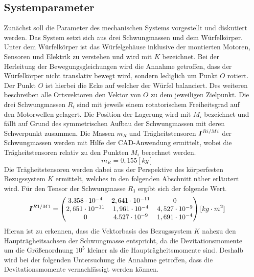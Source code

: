 \subsection{Systemparameter}
Zunächst soll die Parameter des mechanischen Systems vorgestellt und diskutiert werden. Das System setzt sich aus drei Schwungmassen und dem Würfelkörper. Unter dem Würfelkörper ist das Würfelgehäuse inklusive der montierten Motoren, Sensoren und Elektrik zu verstehen und wird mit $K$ bezeichnet. Bei der Herleitung der Bewegungsgleichungen wird die Annahme getroffen, dass der Würfelkörper nicht translativ bewegt wird, sondern lediglich um Punkt $O$ rotiert. Der Punkt $O$ ist hierbei die Ecke auf welcher der Würfel balanciert. Des weiteren beschreiben alle Ortsvektoren den Vektor von $O$ zu dem jeweiligen Zielpunkt. Die drei Schwungmassen $R_i$ sind mit jeweils einem rotatorischem Freiheitsgrad auf den Motorwellen gelagert. Die Position der Lagerung wird mit $M_i$ bezeichnet und fällt auf Grund des symmetrischen Aufbau der Schwungmassen mit deren Schwerpunkt zusammen.
Die Massen $m_R$ und Trägheitstensoren $\boldsymbol{I}^{Ri/Mi}$ der Schwungmassen werden mit Hilfe der CAD-Anwendung ermittelt, wobei die Trägheitstensoren relativ zu den Punkten $M_i$ berechnet werden.
\begin{equation}
m_R = 0,155 [kg]
\end{equation} 
Die Trägheitstensoren werden dabei aus der Perspektive des körperfesten Bezugssystem $K$ ermittelt, welches in den folgenden Abschnitt näher erläutert wird. Für den Tensor der Schwungmasse $R_1$ ergibt sich der folgende Wert.
\begin{equation}
 \boldsymbol{I}^{R1/M1} = \begin{pmatrix}
3.358\cdot 10^{-4} & 2,641\cdot 10^{-11} & 0 \\
2,651\cdot 10^{-11} & 1,961\cdot 10^{-4} & 4,527\cdot 10^{-9} \\
0 & 4.527\cdot 10^{-9} & 1,691\cdot 10^{-4}
\end{pmatrix}[kg\cdot m^2]
\end{equation}
Hieran ist zu erkennen, dass die Vektorbasis des Bezugssystem $K$ nahezu den Haupträgheitsachsen der Schwungmasse entspricht, da die Devitationsmomente um die Größenordnung $10^{5}$ kleiner als die Haupträgheitsmomente sind. Deshalb wird bei der  
folgenden Untersuchung die Annahme getroffen, dass die Devitationsmomente vernachlässigt werden können. 
